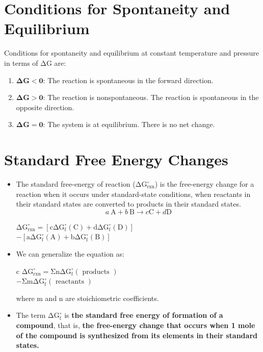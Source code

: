 \documentclass[a4paper,12pt,twocolumn]{article}
\begin{document}
\section{Conditions for Spontaneity and Equilibrium}
Conditions for spontaneity and equilibrium at constant temperature and pressure in terms of $\mathrm{\Delta G}$ are:
\begin{enumerate}
\item $\mathbf{\Delta G < 0}$: The reaction is spontaneous in the forward direction.
\item $\mathbf{\Delta G > 0}$: The reaction is nonspontaneous. The reaction is spontaneous in the opposite direction.
\item $\mathbf{\Delta G = 0}$: The system is at equilibrium. There is no net change.
\end{enumerate}
\section{Standard Free Energy Changes}
\begin{itemize}
\item The standard free-energy of reaction ($\mathrm{\Delta G_{\mathrm{rxn}}^{\circ}}$) is the free-energy change for a reaction when it occurs under standard-state conditions, when reactants in their standard states are converted to products in their standard states.
$$a \mathrm{~A}+b \mathrm{~B} \longrightarrow c \mathrm{C}+d \mathrm{D}$$
\begin{center}
$\mathrm{\Delta G_{\mathrm{rxn}}^{\circ}=\left[c \Delta G_{\mathrm{f}}^{\circ}(\mathrm{C})+d \Delta G_{\mathrm{f}}^{\circ}(\mathrm{D})\right]}$\\
$\mathrm{-\left[a \Delta G_{\mathrm{f}}^{\circ}(\mathrm{A})+b \Delta G_{\mathrm{f}}^{\circ}(\mathrm{B})\right]}$
\end{center}
\item We can generalize the equation as:
\begin{center}{c}
$\mathrm{\Delta G_{\mathrm{rxn}}^{\circ}=\Sigma n \Delta G_{\mathrm{f}}^{\circ}(\text { products })}$\\
$\mathrm{-\Sigma m \Delta G_{\mathrm{f}}^{\circ}(\text { reactants })}$
\end{center}
where m and n are stoichiometric coefficients. 
\item The term $\mathrm{\Delta G_{\mathrm{f}}^{\circ}}$  is \textbf{the standard free energy of formation of a compound}, that is, \textbf{the free-energy change that occurs when 1 mole of the compound is synthesized from its elements in their standard states.}
\end{itemize}
\end{document}
